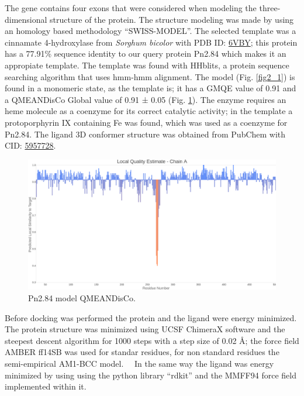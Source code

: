 \documentclass[12pt]{article}
\begin{document}
	The gene contains four exons that were considered when modeling the three-dimensional structure of the protein. The structure modeling was made by using an homology based methodology ``SWISS-MODEL''. \cite{swiss} The selected template was a cinnamate 4-hydroxylase from \textit{Sorghum bicolor} with PDB ID: \href{https://www.rcsb.org/structure/6VBY}{6VBY}; this protein has a 77.91\% sequence identity to our query protein Pn2.84 which makes it an appropiate template. The template was found with HHblits, a protein sequence searching algorithm that uses hmm-hmm alignment. \cite{hhblits} The model (Fig. \ref{fig2_1}) is found in a monomeric state, as the template is; it has a GMQE value of 0.91 and a QMEANDisCo Global value of 0.91 ± 0.05 (Fig. \ref{fig2_2}). \cite{qmeandisco_swiss} The enzyme requires an heme molecule as a coenzyme for its correct catalytic activity; in the template a protoporphyrin IX containing Fe was found, which was used as a coenzyme for Pn2.84. The ligand 3D conformer structure was obtained from PubChem with CID: \href{https://pubchem.ncbi.nlm.nih.gov/compound/5957728}{5957728}.
	
	
	\FloatBarrier
	\begin{figure}[h!]
		\centering
		\includegraphics[width=\textwidth-50pt]{../2/Swiss/Local_quality_estimate.png}
		\caption{Pn2.84 model QMEANDisCo.}
		\label{fig2_2}
	\end{figure}
	\FloatBarrier
	
	Before docking was performed the protein and the ligand were energy minimized. The protein structure was minimized using UCSF ChimeraX software \cite{chimera,chimera_2} and the steepest descent algorithm for 1000 steps with a step size of 0.02 \r{A}; the force field AMBER ff14SB was used for standar residues, for non standard residues the semi-empirical AM1-BCC model. \cite{am1_bcc,am1_bcc_2,am1_bcc_3}\ \ In the same way the ligand was energy minimized by using using the python library ``rdkit'' and the MMFF94 force field implemented within it. \cite{rdkit,rdkit_mmff}
	
\end{document}
